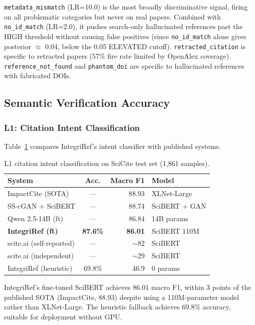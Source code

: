 \documentclass[sigconf,nonacm]{acmart}
\begin{document}
\texttt{metadata\_mismatch} (LR=10.0) is the most broadly discriminative signal, firing on all problematic categories but never on real papers.
Combined with \texttt{no\_id\_match} (LR=2.0), it pushes search-only hallucinated references past the HIGH threshold without causing false positives (since \texttt{no\_id\_match} alone gives posterior $\approx$ 0.04, below the 0.05 ELEVATED cutoff).
\texttt{retracted\_citation} is specific to retracted papers (57\% fire rate limited by OpenAlex coverage).
\texttt{reference\_not\_found} and \texttt{phantom\_doi} are specific to hallucinated references with fabricated DOIs.

\subsection{Semantic Verification Accuracy}

\subsubsection{L1: Citation Intent Classification}

Table~\ref{tab:l1_results} compares IntegriRef's intent classifier with published systems.

\begin{table}[t]
\caption{L1 citation intent classification on SciCite test set (1,861 samples).}
\label{tab:l1_results}
\centering
\small
\begin{tabular}{lcrl}
\toprule
\textbf{System} & \textbf{Acc.} & \textbf{Macro F1} & \textbf{Model} \\
\midrule
ImpactCite (SOTA)         & ---    & 88.93 & XLNet-Large \\
SS-cGAN + SciBERT         & ---    & 88.74 & SciBERT + GAN \\
Qwen 2.5-14B (ft)         & ---    & 86.84 & 14B params \\
\textbf{IntegriRef (ft)}  & \textbf{87.6\%} & \textbf{86.01} & SciBERT 110M \\
scite.ai (self-reported)  & ---    & $\sim$82 & SciBERT \\
scite.ai (independent)    & ---    & $\sim$29 & SciBERT \\
IntegriRef (heuristic)    & 69.8\% & 46.9 & 0 params \\
\bottomrule
\end{tabular}
\end{table}

IntegriRef's fine-tuned SciBERT achieves 86.01 macro F1, within 3 points of the published SOTA (ImpactCite, 88.93) despite using a 110M-parameter model rather than XLNet-Large.
The heuristic fallback achieves 69.8\% accuracy, suitable for deployment without GPU.
\end{document}
